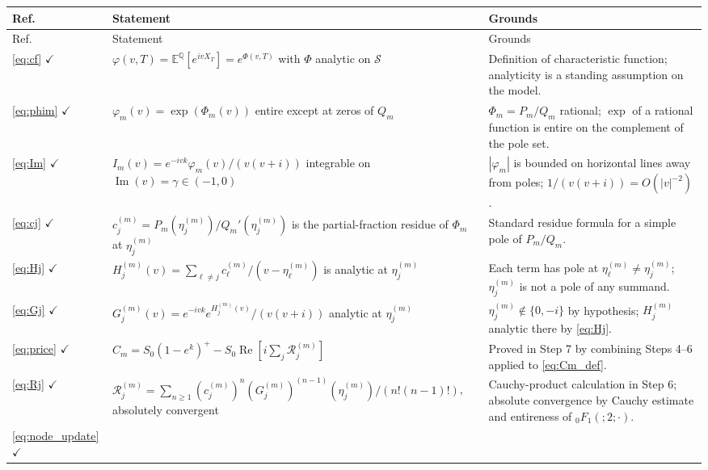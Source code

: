 \documentclass{article}
\newcommand{\Q}{\mathbb{Q}}
\newcommand{\E}{\mathbb{E}}
\newcommand{\cR}{\mathcal{R}}
\newcommand{\cS}{\mathcal{S}}
\begin{document}
\begingroup\small
\begin{longtable}{@{}p{}p{}p{}@{}}
\toprule
Ref. & Statement & Grounds \\
\midrule
\endfirsthead
\toprule
Ref. & Statement & Grounds \\
\midrule
\endhead
\bottomrule
\endfoot
%
\eqref{eq:cf} $\checkmark$
  & $\varphi(v,T)=\E^\Q[e^{ivX_T}]=e^{\Phi(v,T)}$ with $\Phi$ analytic
    on $\cS$
  & Definition of characteristic function; analyticity is a standing
    assumption on the model. \\
\addlinespace
%
\eqref{eq:phim} $\checkmark$
  & $\varphi_m(v)=\exp(\Phi_m(v))$ entire except at zeros of $Q_m$
  & $\Phi_m = P_m/Q_m$ rational; $\exp$ of a rational function is
    entire on the complement of the pole set. \\
\addlinespace
%
\eqref{eq:Im} $\checkmark$
  & $I_m(v) = e^{-ivk}\varphi_m(v)/(v(v+i))$ integrable on
    $\operatorname{Im}(v)=\gamma\in(-1,0)$
  & $|\varphi_m|$ is bounded on horizontal lines away from poles;
    $1/(v(v+i))=O(|v|^{-2})$. \\
\addlinespace
%
\eqref{eq:cj} $\checkmark$
  & $c_j^{(m)} = P_m(\eta_j^{(m)})/Q_m'(\eta_j^{(m)})$ is the
    partial-fraction residue of $\Phi_m$ at $\eta_j^{(m)}$
  & Standard residue formula for a simple pole of $P_m/Q_m$. \\
\addlinespace
%
\eqref{eq:Hj} $\checkmark$
  & $H_j^{(m)}(v) = \sum_{\ell\ne j} c_\ell^{(m)}/(v-\eta_\ell^{(m)})$
    is analytic at $\eta_j^{(m)}$
  & Each term has pole at $\eta_\ell^{(m)}\ne\eta_j^{(m)}$;
    $\eta_j^{(m)}$ is not a pole of any summand. \\
\addlinespace
%
\eqref{eq:Gj} $\checkmark$
  & $G_j^{(m)}(v) = e^{-ivk}e^{H_j^{(m)}(v)}/(v(v+i))$ analytic at
    $\eta_j^{(m)}$
  & $\eta_j^{(m)}\notin\{0,-i\}$ by hypothesis; $H_j^{(m)}$ analytic
    there by \eqref{eq:Hj}. \\
\addlinespace
%
\eqref{eq:price} $\checkmark$
  & $C_m = S_0(1-e^k)^+ - S_0\operatorname{Re}[i\sum_j\cR_j^{(m)}]$
  & Proved in Step 7 by combining Steps 4--6 applied to
    \eqref{eq:Cm_def}. \\
\addlinespace
%
\eqref{eq:Rj} $\checkmark$
  & $\cR_j^{(m)} = \sum_{n\ge 1}(c_j^{(m)})^n(G_j^{(m)})^{(n-1)}(\eta_j^{(m)})/(n!(n-1)!)$,
    absolutely convergent
  & Cauchy-product calculation in Step 6; absolute convergence by
    Cauchy estimate and entireness of ${}_0F_1(;2;\cdot)$. \\
\addlinespace
%
\eqref{eq:node_update} $\checkmark$

\end{longtable}
\end{document}
